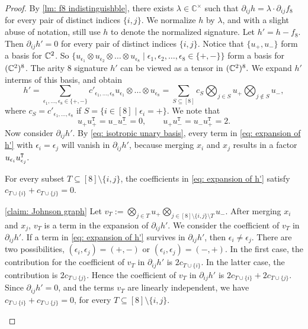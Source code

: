 \begin{proof}
By \cref{lm: f8 indistinguishble}, there exists $\lambda\in \mathbb C^\times$ such that $\partial_{ij}h=\lambda\cdot \partial_{ij}f_8$ for every pair of distinct indices $\{i,j\}.$
We normalize $h$ by $\lambda$, and with a slight abuse of notation, still use $h$ to denote the normalized signature.
Let $h'=h-f_8$.
Then $\partial_{ij}h'=0$ for every pair of distinct indices $\{i,j\}.$
Notice that $\{u_+,u_{-}\}$ form a basis for $\mathbb{C}^2$.
So $\{u_{\epsilon_1}\otimes u_{\epsilon_2}\otimes\ldots \otimes u_{\epsilon_8}\mid \epsilon_1,\epsilon_2,\ldots,\epsilon_8\in\{+,-\}\}$ form a basis for $(\mathbb{C}^2)^8$.
The arity $8$ signature $h'$ can be viewed as a tensor in $(\mathbb{C}^2)^8.$
We expand $h'$ interms of this basis, and obtain
\begin{equation}\label{eq: expansion of h'}
    h'=\sum_{\epsilon_1,\ldots, \epsilon_8\in\{+,-\}}c'_{\epsilon_1,\ldots,\epsilon_8}u_{\epsilon_1}\otimes\ldots\otimes u_{\epsilon_8}=\sum_{S\subseteq[8]}c_S \bigotimes_{j\in S}u_+ \bigotimes_{j\notin S}u_{-},
\end{equation}
where $c_S=c'_{\epsilon_1,\ldots,\epsilon_8}$ if $S=\{i\in[8]\mid \epsilon_i=+\}.$
We note that
\begin{equation}
 u_+u_+^{\mathtt T}=u_-u_-^{\mathtt T}=0,\qquad
 u_+u_-^{\mathtt T}=u_-u_+^{\mathtt T}=2.
 \label{eq: isotropic unary basis}
\end{equation}
Now consider $\partial_{ij}h'.$
By \eqref{eq: isotropic unary basis}, every term in \eqref{eq: expansion of h'} with $\epsilon_i=\epsilon_j$ will vanish in $\partial_{ij}h'$, because merging $x_i$ and $x_j$ results in a factor $u_{\epsilon_i}u_{\epsilon_j}^{\tt T}.$
\begin{claim}\label{claim: Johnson graph}
    For every subset $T\subseteq[8]\setminus\{i,j\}$, the coefficients in \eqref{eq: expansion of h'} satisfy $c_{T\cup\{i\}}+c_{T\cup\{j\}}=0.$
\end{claim}
\begin{claimproof}{\cref{claim: Johnson graph}}
    Let $v_T:=\bigotimes_{j\in T} u_+\bigotimes_{j\in [8]\setminus\{i,j\}\setminus T}u_-.$
    After merging $x_i$ and $x_j$, $v_T$ is a term in the expansion of $\partial_{ij}h'$.
    We consider the coefficient of $v_T$ in $\partial_{ij}h'.$
    If a term in \eqref{eq: expansion of h'} survives in $\partial_{ij}h'$, then $\epsilon_i\neq\epsilon_j.$
    There are two possibilities, $(\epsilon_i,\epsilon_j)=(+,-)$ or $(\epsilon_i,\epsilon_j)=(-,+).$
    In the first case, the contribution for the coefficient of $v_T$ in $\partial_{ij}h'$ is $2c_{T\cup \{i\}}.$
    In the latter case, the contribution is $2c_{T\cup \{j\}}.$
    Hence the coefficient of $v_T$ in $\partial_{ij}h'$ is $2c_{T\cup \{i\}}+2c_{T\cup \{j\}}.$
    Since $\partial_{ij}h'=0$, and the terms $v_T$ are linearly independent, we have $c_{T\cup\{i\}}+c_{T\cup \{j\}}=0$, for every $T\subseteq[8]\setminus \{i,j\}.$
\end{claimproof}


\end{proof}
